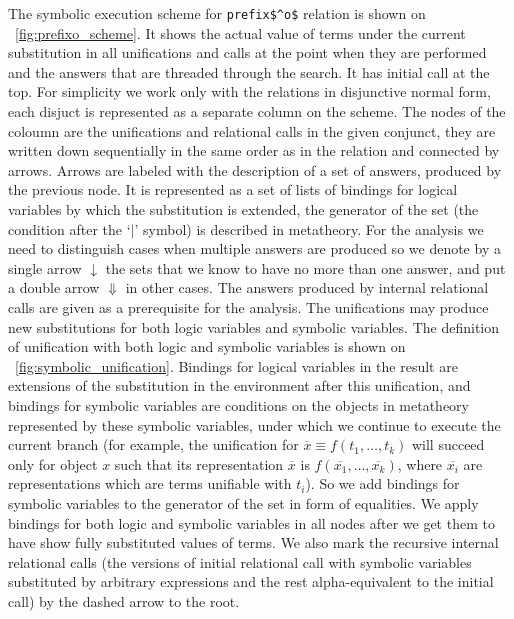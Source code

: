 The symbolic execution scheme for \lstinline|prefix$^o$| relation is shown on \figureword~\ref{fig:prefixo_scheme}. It shows the actual value of terms under the current substitution in all unifications and calls at the point when they are performed and the answers that are threaded through the search. It has initial call at the top. For simplicity we work only with the relations in disjunctive normal form, each disjuct is represented as a separate column on the scheme. The nodes of the coloumn are the unifications and relational calls in the given conjunct, they are written down sequentially in the same order as in the relation and connected by arrows. Arrows are labeled with the description of a set of answers, produced by the previous node. It is represented as a set of lists of bindings for logical variables by which the substitution is extended, the generator of the set (the condition after the `$\mid$' symbol) is described in metatheory. For the analysis we need to distinguish cases when multiple answers are produced so we denote by a single arrow $\downarrow$ the sets that we know to have no more than one answer, and put a double arrow $\Downarrow$ in other cases. The answers produced by internal relational calls are given as a prerequisite for the analysis. The unifications may produce new substitutions for both logic variables and symbolic variables. The definition of unification with both logic and symbolic variables is shown on \figureword~\ref{fig:symbolic_unification}. Bindings for logical variables in the result are extensions of the substitution in the environment after this unification, and bindings for symbolic variables are conditions on the objects in metatheory represented by these symbolic variables, under which we continue to execute the current branch (for example, the unification for $\overline{x} \equiv f(t_1, \dots, t_k)$ will succeed only for object $x$ such that its representation $\overline{x}$ is $f(\overline{x_1}, \dots, \overline{x_k})$, where $\overline{x_i}$ are representations which are terms unifiable with $t_i$). So we add bindings for symbolic variables to the generator of the set in form of equalities. We apply bindings for both logic and symbolic variables in all nodes after we get them to have show fully substituted values of terms. We also mark the recursive internal relational calls (the versions of initial relational call with symbolic variables substituted by arbitrary expressions and the rest alpha-equivalent to the initial call) by the dashed arrow to the root.

